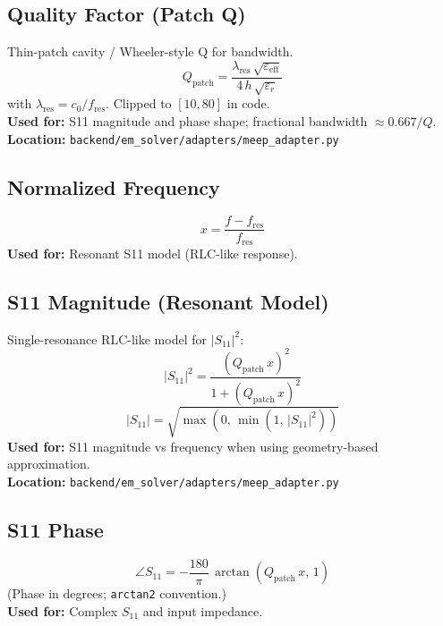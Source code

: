 \documentclass[11pt,a4paper]{article}
\begin{document}
\subsection{Quality Factor (Patch Q)}
Thin-patch cavity / Wheeler-style Q for bandwidth.
\begin{equation}
Q_{\mathrm{patch}} = \frac{\lambda_{\mathrm{res}}\, \sqrt{\varepsilon_{\mathrm{eff}}}}{4\, h\, \sqrt{\varepsilon_r}}
\end{equation}
with \(\lambda_{\mathrm{res}} = c_0 / f_{\mathrm{res}}\). Clipped to \([10, 80]\) in code. \\
\textbf{Used for:} S11 magnitude and phase shape; fractional bandwidth \(\approx 0.667/Q\). \\
\textbf{Location:} \texttt{backend/em\_solver/adapters/meep\_adapter.py}

\subsection{Normalized Frequency}
\begin{equation}
x = \frac{f - f_{\mathrm{res}}}{f_{\mathrm{res}}}
\end{equation}
\textbf{Used for:} Resonant S11 model (RLC-like response).

\subsection{S11 Magnitude (Resonant Model)}
Single-resonance RLC-like model for \(|S_{11}|^2\):
\begin{equation}
|S_{11}|^2 = \frac{(Q_{\mathrm{patch}}\, x)^2}{1 + (Q_{\mathrm{patch}}\, x)^2}
\end{equation}
\begin{equation}
|S_{11}| = \sqrt{\max(0,\, \min(1,\, |S_{11}|^2))}
\end{equation}
\textbf{Used for:} S11 magnitude vs frequency when using geometry-based approximation. \\
\textbf{Location:} \texttt{backend/em\_solver/adapters/meep\_adapter.py}

\subsection{S11 Phase}
\begin{equation}
\angle S_{11} = -\frac{180}{\pi}\,\arctan(Q_{\mathrm{patch}}\, x,\, 1)
\end{equation}
(Phase in degrees; \texttt{arctan2} convention.) \\
\textbf{Used for:} Complex \(S_{11}\) and input impedance.
\end{document}
